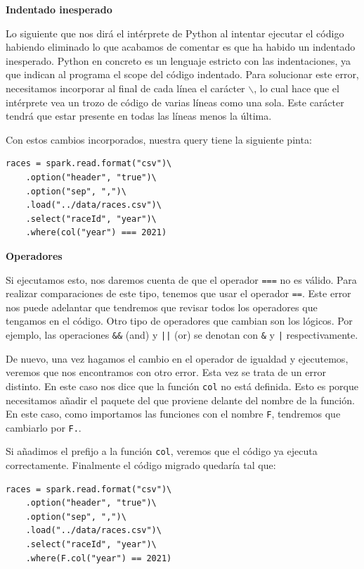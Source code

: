 \documentclass[12pt,twoside,titlepage]{report}
\begin{document}
\textbf{Indentado inesperado}

Lo siguiente que nos dirá el intérprete de Python al intentar ejecutar el código habiendo eliminado lo que acabamos de comentar es que ha habido un indentado inesperado. Python en concreto es un lenguaje estricto con las indentaciones, ya que indican al programa el scope del código indentado. Para solucionar este error, necesitamos incorporar al final de cada línea el carácter \texttt{$\backslash$}, lo cual hace que el intérprete vea un trozo de código de varias líneas como una sola. Este carácter tendrá que estar presente en todas las líneas menos la última.

Con estos cambios incorporados, nuestra query tiene la siguiente pinta:

\begin{lstlisting}
races = spark.read.format("csv")\
	.option("header", "true")\
	.option("sep", ",")\
	.load("../data/races.csv")\
	.select("raceId", "year")\
	.where(col("year") === 2021)
\end{lstlisting}

\textbf{Operadores}

Si ejecutamos esto, nos daremos cuenta de que el operador \texttt{===} no es válido. Para realizar comparaciones de este tipo, tenemos que usar el operador \texttt{==}. Este error nos puede adelantar que tendremos que revisar todos los operadores que tengamos en el código. Otro tipo de operadores que cambian son los lógicos. Por ejemplo, las operaciones \texttt{\&\&} (and) y \texttt{||} (or) se denotan con \texttt{\&} y \texttt{|} respectivamente.

De nuevo, una vez hagamos el cambio en el operador de igualdad y ejecutemos, veremos que nos encontramos con otro error. Esta vez se trata de un error distinto. En este caso nos dice que la función \texttt{col} no está definida. Esto es porque necesitamos añadir el paquete del que proviene delante del nombre de la función. En este caso, como importamos las funciones con el nombre \texttt{F}, tendremos que cambiarlo por \texttt{F.}.

Si añadimos el prefijo a la función \texttt{col}, veremos que el código ya ejecuta correctamente. Finalmente el código migrado quedaría tal que:

\begin{lstlisting}
races = spark.read.format("csv")\
	.option("header", "true")\
	.option("sep", ",")\
	.load("../data/races.csv")\
	.select("raceId", "year")\
	.where(F.col("year") == 2021)
\end{lstlisting}
\end{document}
